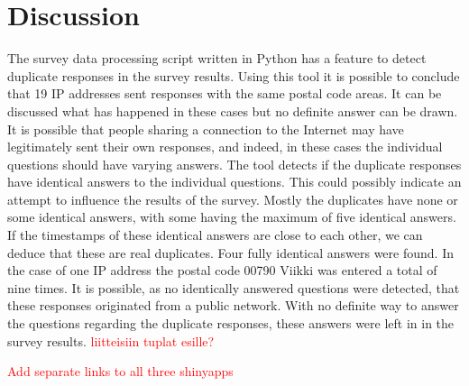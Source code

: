 \section{Discussion}
\justify


The survey data processing script written in Python has a feature to detect duplicate responses in the survey results. Using this tool it is possible to conclude that 19 IP addresses sent responses with the same postal code areas. It can be discussed what has happened in these cases but no definite answer can be drawn. It is possible that people sharing a connection to the Internet may have legitimately sent their own responses, and indeed, in these cases the individual questions should have varying answers. The tool detects if the duplicate responses have identical answers to the individual questions. This could possibly indicate an attempt to influence the results of the survey. Mostly the duplicates have none or some identical answers, with some having the maximum of five identical answers. If the timestamps of these identical answers are close to each other, we can deduce that these are real duplicates. Four fully identical answers were found. In the case of one IP address the postal code 00790 Viikki was entered a total of nine times. It is possible, as no identically answered questions were detected, that these responses originated from a public network. With no definite way to answer the questions regarding the duplicate responses, these answers were left in in the survey results. \textcolor{red}{liitteisiin tuplat esille?}

\textcolor{red}{Add separate links to all three shinyapps}